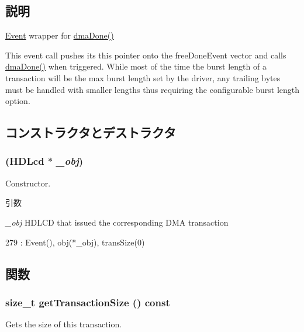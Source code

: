 \subsection{説明}
\hyperlink{classEvent}{Event} wrapper for \hyperlink{classHDLcd_aa86bef1e89693640a33feac9f6871f35}{dmaDone()}

This event call pushes its this pointer onto the freeDoneEvent vector and calls \hyperlink{classHDLcd_aa86bef1e89693640a33feac9f6871f35}{dmaDone()} when triggered. While most of the time the burst length of a transaction will be the max burst length set by the driver, any trailing bytes must be handled with smaller lengths thus requiring the configurable burst length option. 

\subsection{コンストラクタとデストラクタ}
\hypertarget{classHDLcd_1_1DmaDoneEvent_a4acb43ff14cf95fdb8b82edab387d481}{
\subsubsection[{DmaDoneEvent}]{ ({\bf HDLcd} $\ast$ {\em \_\-obj})}}
\label{classHDLcd_1_1DmaDoneEvent_a4acb43ff14cf95fdb8b82edab387d481}
Constructor.


\begin{DoxyParams}{引数}
\item[{\em \_\-obj}]HDLCD that issued the corresponding DMA transaction \end{DoxyParams}



\begin{DoxyCode}
279             : Event(), obj(*_obj), transSize(0) {}
\end{DoxyCode}


\subsection{関数}
\hypertarget{classHDLcd_1_1DmaDoneEvent_a356e84d2c44afe22a5887853711ff2a2}{
\subsubsection[{getTransactionSize}]{\setlength{\rightskip}{0pt plus 5cm}size\_\-t getTransactionSize () const}}
\label{classHDLcd_1_1DmaDoneEvent_a356e84d2c44afe22a5887853711ff2a2}
Gets the size of this transaction.

